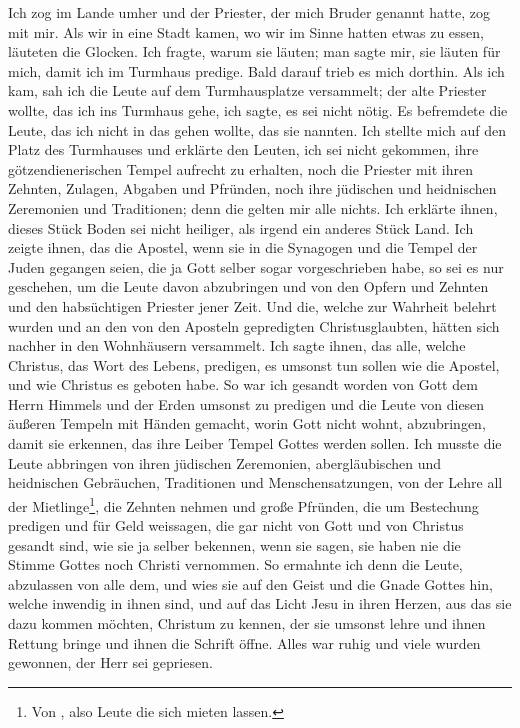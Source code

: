 Ich zog im Lande umher und der Priester, der mich Bruder
genannt hatte, zog mit mir. Als wir in eine Stadt kamen, wo
wir im Sinne hatten etwas zu essen, läuteten die Glocken.
Ich fragte, warum sie läuten; man sagte mir, sie läuten für mich,
damit ich im Turmhaus predige. Bald darauf trieb es mich
dorthin. Als ich kam, sah ich die Leute auf dem Turmhausplatze
versammelt; der alte Priester wollte, das ich ins Turmhaus gehe,
ich sagte, es sei nicht nötig. Es befremdete die Leute, das
ich nicht in das gehen wollte, das sie  nannten. Ich
stellte mich auf den Platz des Turmhauses und erklärte den Leuten,
ich sei nicht gekommen, ihre 
götzendienerischen Tempel aufrecht
zu erhalten, noch die Priester mit ihren Zehnten, Zulagen, 
Abgaben und Pfründen, noch ihre jüdischen 
und heidnischen 
Zeremonien und Traditionen; denn die gelten mir alle nichts. Ich 
erklärte ihnen, dieses Stück Boden sei nicht heiliger, als irgend ein
anderes Stück Land. Ich zeigte 
ihnen, das die Apostel, wenn
sie in die Synagogen und die Tempel der Juden gegangen seien,
die ja Gott selber sogar vorgeschrieben habe, so sei es nur 
geschehen, um die Leute davon abzubringen und von den Opfern
und Zehnten und den habsüchtigen Priester jener Zeit. Und
die, welche zur Wahrheit belehrt wurden und an den von den
Aposteln gepredigten Christusglaubten, hätten sich nachher in
den Wohnhäusern versammelt. Ich sagte ihnen, das alle, welche
Christus, das Wort des Lebens, predigen, es umsonst tun sollen
wie die Apostel, und wie Christus es geboten habe. So war ich
gesandt worden von Gott 
dem Herrn Himmels und der Erden
umsonst zu predigen und die Leute von diesen äußeren Tempeln
mit Händen gemacht, worin Gott nicht wohnt, abzubringen, damit
sie erkennen, das ihre Leiber Tempel Gottes werden sollen. Ich
musste die Leute abbringen von ihren jüdischen Zeremonien, 
abergläubischen und heidnischen Gebräuchen, 
Traditionen und Menschensatzungen, von der Lehre 
all der Mietlinge\footnote{Von , also Leute
die sich mieten lassen.}, die Zehnten nehmen
und große Pfründen, die um Bestechung predigen und für Geld
weissagen, die gar nicht von Gott und 
von Christus gesandt
sind, wie sie ja selber bekennen, wenn sie sagen, sie haben nie
die Stimme Gottes noch Christi vernommen. So ermahnte ich
denn die Leute, abzulassen von alle dem, und wies sie auf den
Geist und die Gnade Gottes hin, welche inwendig in ihnen sind,
und auf das Licht Jesu in ihren Herzen, aus das sie dazu kommen
möchten, Christum zu kennen, der sie umsonst lehre und ihnen
Rettung bringe und ihnen die Schrift öffne. Alles war ruhig
und viele wurden gewonnen, der Herr sei gepriesen.

